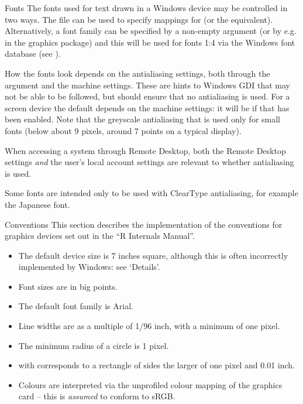 %
\begin{Section}{Fonts}
The fonts used for text drawn in a Windows device may be controlled in
two ways.  The file  can be used to
specify mappings for  (or the  equivalent).
Alternatively, a font family can be specified by a non-empty
 argument (or by e.g.  in the graphics
package) and this will be used for fonts 1:4 via the Windows font
database (see ).

How the fonts look depends on the antialiasing settings, both through
the  argument and the machine settings.  These are
hints to Windows GDI that may not be able to be followed, but
 should ensure that no antialiasing is used.
For a screen device the default depends on the machine settings: it
will be  if that has been enabled.  Note that the
greyscale antialiasing that is used only for small fonts (below about
9 pixels, around 7 points on a typical display).

When accessing a system through Remote Desktop, both the Remote
Desktop settings \emph{and} the user's local account settings are
relevant to whether antialiasing is used.

Some fonts are intended only to be used with ClearType antialiasing,
for example the  Japanese font.
\end{Section}
%
\begin{Section}{Conventions}
This section describes the implementation of the conventions for
graphics devices set out in the ``R Internals Manual''.

\begin{itemize}

\item The default device size is 7 inches square, although this is
often incorrectly implemented by Windows: see `Details'.
\item Font sizes are in big points.
\item The default font family is Arial.
\item Line widths are as a multiple of 1/96 inch, with a minimum of
one pixel. 
\item The minimum radius of a circle is 1 pixel.
\item {} with  corresponds to a rectangle of sides
the larger of one pixel and 0.01 inch.
\item Colours are interpreted via the unprofiled colour mapping of
the graphics card -- this is \emph{assumed} to conform to sRGB.

\end{itemize}

\end{Section}
